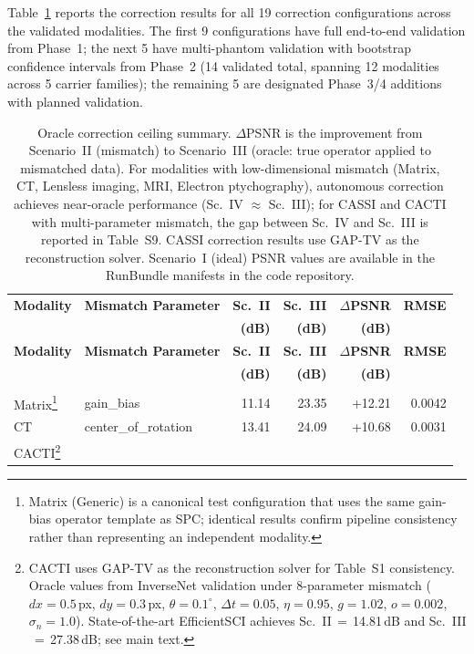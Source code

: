 \documentclass[11pt]{article}
\begin{document}
Table~\ref{tab:correction_params} reports the correction results for all 19
correction configurations across the validated modalities.  The first 9 configurations
have full end-to-end validation from Phase~1; the next 5 have multi-phantom
validation with bootstrap confidence intervals from Phase~2 (14 validated total,
spanning 12 modalities across 5 carrier families); the remaining 5 are
designated Phase~3/4 additions with planned validation.

\begin{longtable}{>{\raggedright}p{2.0cm} >{\raggedright}p{2.8cm}
                  r r r r}
\caption{Oracle correction ceiling summary.  $\Delta$PSNR is the
improvement from Scenario~II (mismatch) to Scenario~III (oracle: true operator applied to mismatched data).
For modalities with low-dimensional mismatch (Matrix, CT, Lensless imaging, MRI, Electron ptychography), autonomous correction achieves near-oracle performance (Sc.~IV $\approx$ Sc.~III); for CASSI and CACTI with multi-parameter mismatch, the gap between Sc.~IV and Sc.~III is reported in Table~S9. CASSI correction results use GAP-TV as the reconstruction solver.
Scenario~I (ideal) PSNR values are available in the RunBundle manifests in the code repository.}
\label{tab:correction_params} \\
\toprule
\textbf{Modality} & \textbf{Mismatch Parameter} &
  \textbf{Sc.~II} & \textbf{Sc.~III} &
  \textbf{$\Delta$PSNR} & \textbf{RMSE} \\
  & & \textbf{(dB)} & \textbf{(dB)} & \textbf{(dB)} & \\
\midrule
\endfirsthead
\toprule
\textbf{Modality} & \textbf{Mismatch Parameter} &
  \textbf{Sc.~II} & \textbf{Sc.~III} &
  \textbf{$\Delta$PSNR} & \textbf{RMSE} \\
  & & \textbf{(dB)} & \textbf{(dB)} & \textbf{(dB)} & \\
\midrule
\endhead
\midrule
\multicolumn{6}{r}{\emph{Continued on next page}} \\
\endfoot
\bottomrule
\endlastfoot
Matrix\footnote{Matrix (Generic) is a canonical test configuration that uses the same gain-bias operator template as SPC; identical results confirm pipeline consistency rather than representing an independent modality.}
  & gain\_bias
  & 11.14 & 23.35 & +12.21
  & 0.0042 \\
CT
  & center\_of\_rotation
  & 13.41 & 24.09 & +10.68
  & 0.0031 \\
CACTI\footnote{CACTI uses GAP-TV as the reconstruction solver for Table~S1 consistency.  Oracle values from InverseNet validation under 8-parameter mismatch ($dx{=}0.5$\,px, $dy{=}0.3$\,px, $\theta{=}0.1^\circ$, $\Delta t{=}0.05$, $\eta{=}0.95$, $g{=}1.02$, $o{=}0.002$, $\sigma_n{=}1.0$).  State-of-the-art EfficientSCI achieves Sc.~II$\,=\,$14.81\,dB and Sc.~III$\,=\,$27.38\,dB; see main text.}

\end{longtable}
\end{document}

